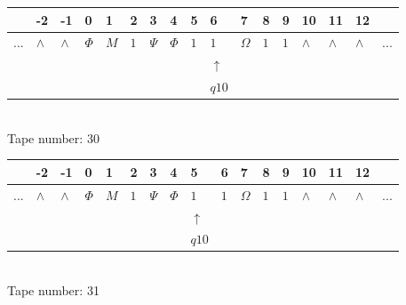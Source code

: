 \documentclass[11pt]{article}
\begin{document}
\begin{table}[H]
\centering
\begin{tabular}{lllllllllllllllll}
 & -2 & -1 & 0 & 1 & 2 & 3 & 4 & 5 & 6 & 7 & 8 & 9 & 10 & 11 & 12 & \\
\hline
$...$ & \multicolumn{1}{|l|}{$\wedge$} & \multicolumn{1}{|l|}{$\wedge$} & \multicolumn{1}{|l|}{$\Phi$} & \multicolumn{1}{|l|}{$M$} & \multicolumn{1}{|l|}{$1$} & \multicolumn{1}{|l|}{$\Psi$} & \multicolumn{1}{|l|}{$\Phi$} & \multicolumn{1}{|l|}{$1$} & \multicolumn{1}{|l|}{$1$} & \multicolumn{1}{|l|}{$\Omega$} & \multicolumn{1}{|l|}{$1$} & \multicolumn{1}{|l|}{$1$} & \multicolumn{1}{|l|}{$\wedge$} & \multicolumn{1}{|l|}{$\wedge$} & \multicolumn{1}{|l|}{$\wedge$} & $...$\\
\hline
&  &  &  &  &  &  &  &  & $\uparrow$ &  &  &  &  &  &  &  \\
&  &  &  &  &  &  &  &  & $ q10 $ &  &  &  &  &  &  &  \\
\end{tabular}
\\
Tape number: 30
\noindent\makebox[\linewidth]{\hdashrule{\textwidth}{1pt}{1pt}}\end{table}

\begin{table}[H]
\centering
\begin{tabular}{lllllllllllllllll}
 & -2 & -1 & 0 & 1 & 2 & 3 & 4 & 5 & 6 & 7 & 8 & 9 & 10 & 11 & 12 & \\
\hline
$...$ & \multicolumn{1}{|l|}{$\wedge$} & \multicolumn{1}{|l|}{$\wedge$} & \multicolumn{1}{|l|}{$\Phi$} & \multicolumn{1}{|l|}{$M$} & \multicolumn{1}{|l|}{$1$} & \multicolumn{1}{|l|}{$\Psi$} & \multicolumn{1}{|l|}{$\Phi$} & \multicolumn{1}{|l|}{$1$} & \multicolumn{1}{|l|}{$1$} & \multicolumn{1}{|l|}{$\Omega$} & \multicolumn{1}{|l|}{$1$} & \multicolumn{1}{|l|}{$1$} & \multicolumn{1}{|l|}{$\wedge$} & \multicolumn{1}{|l|}{$\wedge$} & \multicolumn{1}{|l|}{$\wedge$} & $...$\\
\hline
&  &  &  &  &  &  &  & $\uparrow$ &  &  &  &  &  &  &  &  \\
&  &  &  &  &  &  &  & $ q10 $ &  &  &  &  &  &  &  &  \\
\end{tabular}
\\
Tape number: 31
\noindent\makebox[\linewidth]{\hdashrule{\textwidth}{1pt}{1pt}}\end{table}
\end{document}
